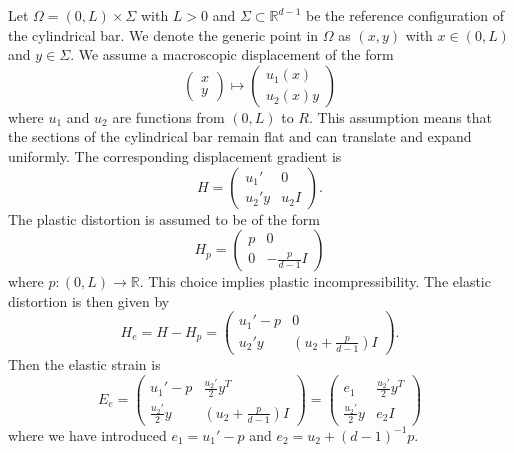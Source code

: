 \documentclass[a4paper,10pt,twoside]{amsbook}
\numberwithin{section}{chapter}
\numberwithin{equation}{chapter}
\theoremstyle{definition}
\begin{document}
Let $\Omega=(0,L)\times\Sigma$ with $L>0$ and $\Sigma\subset\mathbb{R}^{d-1}$ be the reference configuration of the cylindrical bar. We denote the generic point in $\Omega$ as $(x,y)$ with $x\in(0,L)$ and $y\in\Sigma$. We assume a macroscopic displacement of the form
\begin{equation}
\label{eqn:displacement}
\begin{pmatrix}
x \\
y
\end{pmatrix}
\mapsto
\begin{pmatrix}
u_1(x) \\
u_2(x)y
\end{pmatrix}
\end{equation}
where $u_1$ and $u_2$ are functions from $(0,L)$ to ${R}$. This assumption means that the sections of the cylindrical bar remain flat and can translate and expand uniformly. The corresponding displacement gradient is
\[
H=\begin{pmatrix}
u_1' & 0 \\
u_2'y & u_2I
\end{pmatrix}.
\]
The plastic distortion is assumed to be of the form
\begin{equation}
\label{eqn:plastic}
H_p=
\begin{pmatrix}
p & 0 \\
0 & -\frac{p}{d-1}I
\end{pmatrix}
\end{equation}
where $p\colon(0,L)\to\mathbb{R}$. This choice implies plastic incompressibility. The elastic distortion is then given by
\[
H_e=H-H_p=\begin{pmatrix}
u_1'-p & 0 \\
u_2'y & \left(u_2+\frac{p}{d-1}\right)I
\end{pmatrix}.
\]
Then the elastic strain is
\[
E_e=\begin{pmatrix}
u_1'-p & \frac{u_2'}{2}y^T \\
\frac{u_2'}{2}y & \left(u_2+\frac{p}{d-1}\right)I
\end{pmatrix}=
\begin{pmatrix}
e_1 & \frac{u_2'}{2}y^T \\
\frac{u_2'}{2}y & e_2I
\end{pmatrix}
\]
where we have introduced $e_1=u_1'-p$ and $e_2=u_2+(d-1)^{-1}p$.
\end{document}
